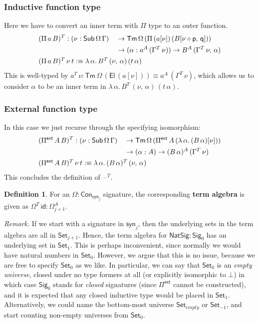 \documentclass[12pt,a4paper,twoside,openany]{book}
\theoremstyle{remark}
\theoremstyle{definition}
\newtheorem{mydefinition}{Definition}
\theoremstyle{theorem}
\newcommand{\id}{\mathsf{id}}
\newcommand{\Con}{\mathsf{Con}}
\newcommand{\Sub}{\mathsf{Sub}}
\newcommand{\Tm}{\mathsf{Tm}}
\newcommand{\El}{\mathsf{El}}
\newcommand{\blank}{\mathord{\hspace{1pt}\text{--}\hspace{1pt}}}
\newcommand{\Set}{\mathsf{Set}}
\newcommand{\Pie}{\Pi^{\mathsf{ext}}}
\newcommand{\Sig}{\mathsf{Sig}}
\newcommand{\NatSig}{\mathsf{NatSig}}
\newcommand{\p}{\mathsf{p}}
\newcommand{\q}{\mathsf{q}}
\newcommand{\syn}{\mathsf{syn}}
\newcommand{\defn}{:\equiv}
\begin{document}
\subsubsection{Inductive function type}
Here we have to convert an inner term with $\Pi$ type to an outer function.
\begin{alignat*}{3}
  &(\Pi\,a\,B)^T : (\nu : \Sub\,\Omega\,\Gamma)
                 &&\to \Tm\,\Omega\,(\Pi\,(a[\nu])\,(B[\nu\circ\p,\,\q]))\\
  &              &&\to (\alpha : a^A\,(\Gamma^T\,\nu)) \to B^A\,(\Gamma^T\,\nu,\,\alpha)\\
  &\rlap{$(\Pi\,a\,B)^T\,\nu\,t \defn \lambda\,\alpha.\,B^T\,(\nu,\,\alpha)\,(t\,\alpha)$}
\end{alignat*}
This is well-typed by $a^T\,\nu :
\Tm\,\Omega\,(\El\,(a[\nu])) \equiv
a^A\,(\Gamma^T\,\nu)$, which allows us to consider $\alpha$ to be an inner term
in $\lambda\,\alpha.\,B^T\,(\nu,\,\alpha)\,(t\,\alpha)$.

\subsubsection{External function type}
In this case we just recurse through the specifying isomorphism:
\begin{alignat*}{3}
  &(\Pie\,A\,B)^T : (\nu : \Sub\,\Omega\,\Gamma)
                 &&\to \Tm\,\Omega\,(\Pie\,A\,(\lambda\,\alpha.\,(B\,\alpha)[\nu]))\\
  &              &&\to (\alpha : A) \to (B\,\alpha)^A\,(\Gamma^T\,\nu)\\
  &\rlap{$(\Pie\,A\,B)^T\,\nu\,t \defn \lambda\,\alpha.\,(B\,\alpha)^T\,(\nu,\,\alpha)$}
\end{alignat*}
This concludes the definition of $\blank^T$.

\begin{mydefinition}
For an $\Omega : \Con_{\syn_j}$ signature, the corresponding \textbf{term
algebra} is given as $\Omega^T\,\id : \Omega^A_{j+1}$.
\end{mydefinition}

\emph{Remark.} If we start with a signature in $\syn_j$, then the underlying
sets in the term algebra are all in $\Set_{j+1}$. Hence, the term algebra for
$\NatSig : \Sig_0$ has an underlying set in $\Set_1$. This is perhaps
inconvenient, since normally we would have natural numbers in $\Set_0$. However,
we argue that this is no issue, because we are free to specify $\Set_0$ as we
like. In particular, we can say that $\Set_0$ is an \emph{empty universe},
closed under no type formers at all (or explicitly isomorphic to $\bot$) in
which case $\Sig_0$ stands for \emph{closed} signatures (since $\Pie$ cannot be
constructed), and it is expected that any closed inductive type would be placed
in $\Set_1$. Alternatively, we could name the bottom-most universe
$\Set_{empty}$ or $\Set_{-1}$, and start counting non-empty universes from
$\Set_0$.
\end{document}
